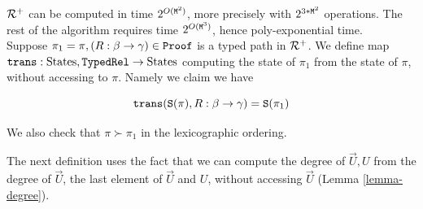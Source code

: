 \documentclass{lmcs}
\newtheorem{definition}[theorem]{Definition}
\begin{document}
${\mathcal R}^+$ can be computed in time $2^{O({\tt M}^2)}$, more precisely with 
$2^{3*{\tt M}^2}$ operations. The rest of the algorithm requires time $2^{O({\tt M}^3)}$,
hence poly-exponential time.
\\


%
%
%


Suppose $\pi_1 = \pi, (R : \beta \rightarrow \gamma) \in {\tt Proof}$ is a typed path in 
${\mathcal R}^+$. We define map ${\tt trans}:  {{\rm States}}, {\tt TypedRel} \rightarrow  {{\rm States}}$ computing the state 
of $\pi_1$ from the state of $\pi$, without accessing to $\pi$. Namely we claim we have

$$
{\tt trans}({\tt S}(\pi), R : \beta \rightarrow \gamma) 
= 
{\tt S}(\pi_1)
$$

We also check that $\pi \succ \pi_1$ in the lexicographic ordering.


%
%



The next definition uses the fact that we can compute the degree of $\vec{U},U$ from
the degree of $\vec{U}$, the last element of $\vec{U}$ and $U$, without accessing $\vec{U}$
(Lemma \ref{lemma-degree}). 
\end{document}
